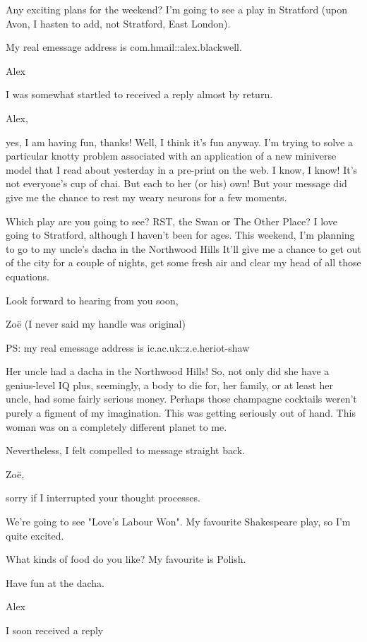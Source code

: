 Any exciting plans for the weekend? I'm going to see a play in
Stratford (upon Avon, I hasten to add, not Stratford, East London).

My real emessage address is com.hmail::alex.blackwell.

Alex
\stopmessage

I was somewhat startled to received a reply almost by return.

\startmessage
Alex,

yes, I am having fun, thanks! Well, I think it's fun anyway. I'm
trying to solve a particular knotty problem associated with an
application of a new miniverse model that I read about yesterday in
a pre-print on the web. I know, I know! It's not everyone's cup of
chai. But each to her (or his) own! But your message did give me the
chance to rest my weary neurons for a few moments.

Which play are you going to see? RST, the Swan or The Other Place? I
love going to Stratford, although I haven't been for ages. This
weekend, I'm planning to go to my uncle's dacha in the Northwood Hills
It'll give me a chance to get out of the city for a couple of
nights, get some fresh air and clear my head of all those equations.

Look forward to hearing from you soon,

Zoë (I never said my handle was original)

PS: my real emessage address is ic.ac.uk::z.e.heriot-shaw
\stopmessage

Her uncle had a dacha in the Northwood Hills! So, not only did she have
a genius-level IQ plus, seemingly, a body to die for, her family, or at least
her uncle, had some fairly serious money. Perhaps those champagne
cocktails weren't purely a figment of my imagination. This was
getting seriously out of hand. This woman was on a completely
different planet to me.

Nevertheless, I felt compelled to message straight back.

\startmessage
Zoë,

sorry if I interrupted your thought processes.

We're going to see "Love's Labour Won". My favourite Shakespeare
play, so I'm quite excited.

What kinds of food do you like? My favourite is Polish.

Have fun at the dacha.

Alex
\stopmessage

I soon received a reply

